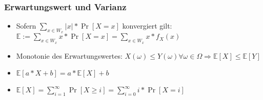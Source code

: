 \subsubsection{Erwartungswert und Varianz}
\begin{itemize}
\item Sofern $\sum_{x\in W_x}|x|*\Pr[X=x]$ konvergiert gilt:\\
	$\mathbb{E}:=\sum_{x\in W_x}x*\Pr[X=x]=\sum_{x\in W_x}x*f_X(x)$
\item Monotonie des Erwartungswertes: $X(\omega)\leq Y(\omega)\forall\omega\in\Omega\Rightarrow \mathbb{E}[X]\leq\mathbb{E}[Y]$
\item $\mathbb{E}[a*X+b]=a*\mathbb{E}[X]+b$
\item $\mathbb{E}[X]=\sum_{i=1}^\infty\Pr[X\geq i]=\sum_{i=0}^\infty i*\Pr[X=i]$
\end{itemize}


